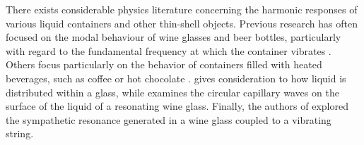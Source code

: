 \documentclass[twoside,a4paper]{article}
\begin{document}
There exists considerable physics literature concerning the harmonic
responses of various liquid containers and other thin-shell objects.
Previous research has often focused on the modal behaviour of wine
glasses and beer bottles, particularly with regard to the fundamental
frequency at which the container vibrates \cite{russelBEER,french1983vino,
chen2005does,rossing1990wine,jundt2006vibrational}. Others focus particularly
on the behavior of containers filled with heated beverages, such as
coffee or hot chocolate \cite{crawford1982hot,morrison2002sound,
morrison2014acoustics}.
\cite{courtois2008tuning} gives consideration to how liquid is distributed
within a glass, while \cite{apfel1982whispering} examines the circular
capillary waves on the surface of the liquid of a resonating wine glass.
Finally, the authors of \cite{arbel2017wine} explored the sympathetic
resonance generated in a wine glass coupled to a vibrating string.

\end{document}
